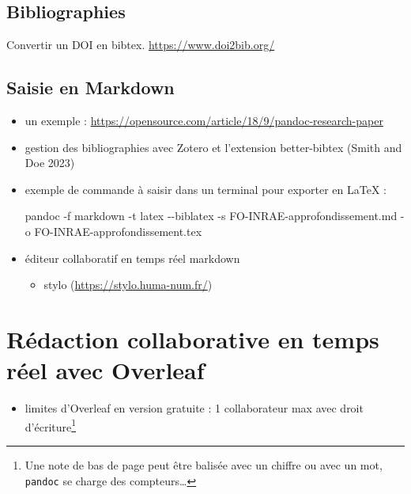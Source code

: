 \documentclass[
]{article}
\newenvironment{Shaded}{}{}
\newcommand{\NormalTok}[1]{#1}
\providecommand{\tightlist}{%
  \setlength{\itemsep}{0pt}\setlength{\parskip}{0pt}}
\begin{document}
\hypertarget{bibliographies}{%
\subsection{Bibliographies}\label{bibliographies}}

Convertir un DOI en bibtex. \url{https://www.doi2bib.org/}

\hypertarget{saisie-en-markdown}{%
\subsection{Saisie en Markdown}\label{saisie-en-markdown}}

\begin{itemize}
\item
  un exemple :
  \url{https://opensource.com/article/18/9/pandoc-research-paper}
\item
  gestion des bibliographies avec Zotero et l'extension better-bibtex
  (Smith and Doe 2023)
\item
  exemple de commande à saisir dans un terminal pour exporter en LaTeX :

\begin{Shaded}
\begin{Highlighting}[]
\NormalTok{pandoc {-}f markdown {-}t latex {-}{-}biblatex {-}s FO{-}INRAE{-}approfondissement.md {-}o FO{-}INRAE{-}approfondissement.tex}
\end{Highlighting}
\end{Shaded}
\item
  éditeur collaboratif en temps réel markdown

  \begin{itemize}
  \tightlist
  \item
    stylo (\url{https://stylo.huma-num.fr/})
  \end{itemize}
\end{itemize}

\hypertarget{ruxe9daction-collaborative-en-temps-ruxe9el-avec-overleaf}{%
\section{Rédaction collaborative en temps réel avec
Overleaf}\label{ruxe9daction-collaborative-en-temps-ruxe9el-avec-overleaf}}

\begin{itemize}
\tightlist
\item
  limites d'Overleaf en version gratuite : 1 collaborateur max avec
  droit d'écriture\footnote{Une note de bas de page peut être balisée
    avec un chiffre ou avec un mot, \texttt{pandoc} se charge des
    compteurs\ldots{}}
\end{itemize}
\end{document}
